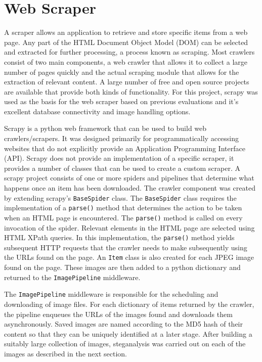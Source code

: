 \section {Web Scraper}
\label{sec:scraper}
A scraper allows an application to retrieve and store specific items from a web page. Any part of the HTML Document Object Model (DOM) can be selected and extracted for further processing, a process known as scraping. Most crawlers consist of two main components, a web crawler that allows it to collect a large number of pages quickly and the actual scraping module that allows for the extraction of relevant content. A large number of free and open source projects are available that provide both kinds of functionality. For this project, scrapy was used as the basis for the web scraper based on previous evaluations and it's excellent database connectivity and image handling options.
\par Scrapy is a python web framework that can be used to build web crawlers/scrapers. It was designed primarily for programmatically accessing websites that do not explicitly provide an Application Programming Interface (API). Scrapy does not provide an implementation of a specific scraper, it provides a number of classes that can be used to create a custom scraper. A scrapy project consists of one or more spiders and pipelines that determine what happens once an item has been downloaded. The crawler component was created by extending scrapy's \texttt{BaseSpider} class. The \texttt{BaseSpider} class requires the implementation of a \texttt{parse()} method that determines the action to be taken when an HTML page is encountered. The \texttt{parse()} method is called on every invocation of the spider. Relevant elements in the HTML page are selected using HTML XPath queries. In this implementation, the \texttt{parse()} method yields subsequent HTTP requests that the crawler needs to make subsequently using the URLs found on the page. An \texttt{Item} class is also created for each JPEG image found on the page. These images are then added to a python dictionary and returned to the \texttt{ImagePipeline} middleware.
\par The \texttt{ImagePipeline} middleware is responsible for the scheduling and downloading of image files. For each dictionary of items returned by the crawler, the pipeline enqueues the URLs of the images found and downloads them asynchronously. Saved images are named according to the MD5 hash of their content so that they can be uniquely identified at a later stage. After building a suitably large collection of images, steganalysis was carried out on each of the images as described in the next section.
